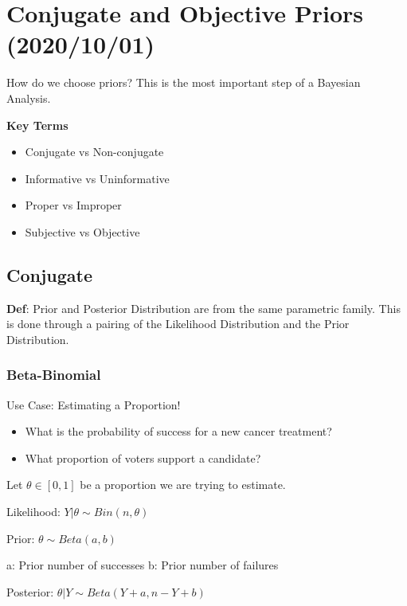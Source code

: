 \documentclass[11pt]{article}
\begin{document}
\section{Conjugate and Objective Priors (2020/10/01)}
\label{sec:org4db18e5}

How do we choose priors? This is the most important step of a Bayesian Analysis.

\textbf{Key Terms}
\begin{itemize}
\item Conjugate vs Non-conjugate
\item Informative vs Uninformative
\item Proper vs Improper
\item Subjective vs Objective
\end{itemize}

\subsection{Conjugate}
\label{sec:orge2378e1}
\textbf{Def}: Prior and Posterior Distribution are from the same parametric family. This is done through a pairing of the Likelihood Distribution and the Prior Distribution.

\subsubsection{Beta-Binomial}
\label{sec:org3997ae0}

Use Case: Estimating a Proportion!

\begin{itemize}
\item What is the probability of success for a new cancer treatment?
\item What proportion of voters support a candidate?
\end{itemize}

Let \(\theta \in [0, 1]\) be a proportion we are trying to estimate.

Likelihood: \(Y | \theta \sim Bin(n, \theta)\)

Prior: \(\theta \sim Beta(a, b)\)

a: Prior number of successes
b: Prior number of failures

Posterior: \(\theta | Y \sim Beta(Y + a, n - Y + b)\)
\end{document}
